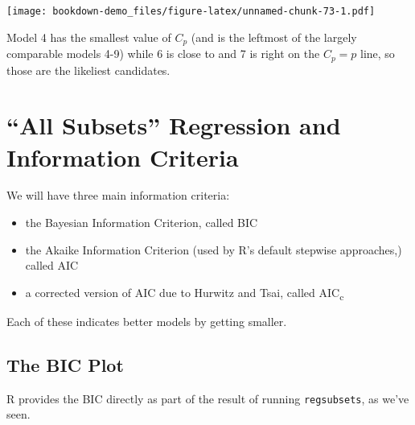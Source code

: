 \documentclass[]{book}
\newenvironment{Shaded}{\begin{snugshade}}{\end{snugshade}}
\newcommand{\KeywordTok}[1]{\textcolor[rgb]{0.13,0.29,0.53}{\textbf{#1}}}
\newcommand{\DataTypeTok}[1]{\textcolor[rgb]{0.13,0.29,0.53}{#1}}
\newcommand{\DecValTok}[1]{\textcolor[rgb]{0.00,0.00,0.81}{#1}}
\newcommand{\FloatTok}[1]{\textcolor[rgb]{0.00,0.00,0.81}{#1}}
\newcommand{\StringTok}[1]{\textcolor[rgb]{0.31,0.60,0.02}{#1}}
\newcommand{\OperatorTok}[1]{\textcolor[rgb]{0.81,0.36,0.00}{\textbf{#1}}}
\newcommand{\NormalTok}[1]{#1}
\providecommand{\tightlist}{%
  \setlength{\itemsep}{0pt}\setlength{\parskip}{0pt}}
\theoremstyle{definition}
\theoremstyle{definition}
\theoremstyle{definition}
\theoremstyle{remark}
\begin{document}
\texttt{[image: bookdown-demo\_files/figure-latex/unnamed-chunk-73-1.pdf]}

Model 4 has the smallest value of \(C_p\) (and is the leftmost of the
largely comparable models 4-9) while 6 is close to and 7 is right on the
\(C_p = p\) line, so those are the likeliest candidates.

\section{\texorpdfstring{``All Subsets'' Regression and Information
Criteria}{All Subsets Regression and Information Criteria}}\label{all-subsets-regression-and-information-criteria}

We will have three main information criteria:

\begin{itemize}
\tightlist
\item
  the Bayesian Information Criterion, called BIC
\item
  the Akaike Information Criterion (used by R's default stepwise
  approaches,) called AIC
\item
  a corrected version of AIC due to Hurwitz and Tsai, called
  AIC\textsubscript{c}
\end{itemize}

Each of these indicates better models by getting smaller.

\subsection{The BIC Plot}\label{the-bic-plot}

R provides the BIC directly as part of the result of running
\texttt{regsubsets}, as we've seen.

\begin{Shaded}
\end{Shaded}
\end{document}
